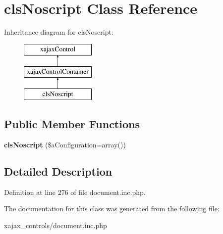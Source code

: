 \hypertarget{classclsNoscript}{
\section{clsNoscript Class Reference}
\label{classclsNoscript}
}
Inheritance diagram for clsNoscript:\begin{figure}[H]
\begin{center}
\leavevmode
\includegraphics[height=3.000000cm]{classclsNoscript}
\end{center}
\end{figure}
\subsection*{Public Member Functions}
\begin{DoxyCompactItemize}
\item 
\hypertarget{classclsNoscript_ae56e3aa5701f902ca5b53fe797aeb49a}{
{\bfseries clsNoscript} (\$aConfiguration=array())}
\label{classclsNoscript_ae56e3aa5701f902ca5b53fe797aeb49a}

\end{DoxyCompactItemize}


\subsection{Detailed Description}


Definition at line 276 of file document.inc.php.



The documentation for this class was generated from the following file:\begin{DoxyCompactItemize}
\item 
xajax\_\-controls/document.inc.php\end{DoxyCompactItemize}
